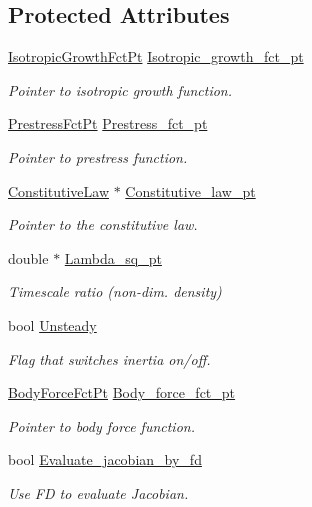 \subsection*{Protected Attributes}
\begin{DoxyCompactItemize}
\item 
\hyperlink{classoomph_1_1PVDEquationsBase_a59fc7069e0330c399ff53aebb6c67729}{Isotropic\+Growth\+Fct\+Pt} \hyperlink{classoomph_1_1PVDEquationsBase_a95f25d5e75bc4af1a6eeeb862546c4ea}{Isotropic\+\_\+growth\+\_\+fct\+\_\+pt}
\begin{DoxyCompactList}\small\item\em Pointer to isotropic growth function. \end{DoxyCompactList}\item 
\hyperlink{classoomph_1_1PVDEquationsBase_a457b9ffb2b62ecc0cf5fe61cf28e98e5}{Prestress\+Fct\+Pt} \hyperlink{classoomph_1_1PVDEquationsBase_ab3093822672a836a47f5a538dc25b2e8}{Prestress\+\_\+fct\+\_\+pt}
\begin{DoxyCompactList}\small\item\em Pointer to prestress function. \end{DoxyCompactList}\item 
\hyperlink{classoomph_1_1ConstitutiveLaw}{Constitutive\+Law} $\ast$ \hyperlink{classoomph_1_1PVDEquationsBase_a4cdbec1d2a282493984883e0e186d393}{Constitutive\+\_\+law\+\_\+pt}
\begin{DoxyCompactList}\small\item\em Pointer to the constitutive law. \end{DoxyCompactList}\item 
double $\ast$ \hyperlink{classoomph_1_1PVDEquationsBase_aeba8ca692b3ea3b8624f3dcc4ab874b7}{Lambda\+\_\+sq\+\_\+pt}
\begin{DoxyCompactList}\small\item\em Timescale ratio (non-\/dim. density) \end{DoxyCompactList}\item 
bool \hyperlink{classoomph_1_1PVDEquationsBase_a0d7944084e6386d9a23225420e7dcdff}{Unsteady}
\begin{DoxyCompactList}\small\item\em Flag that switches inertia on/off. \end{DoxyCompactList}\item 
\hyperlink{classoomph_1_1PVDEquationsBase_aa0d7dc7279aff03dfcc3ad35bb6653be}{Body\+Force\+Fct\+Pt} \hyperlink{classoomph_1_1PVDEquationsBase_a2e578673c31d1afa7fa6f1dc460299ed}{Body\+\_\+force\+\_\+fct\+\_\+pt}
\begin{DoxyCompactList}\small\item\em Pointer to body force function. \end{DoxyCompactList}\item 
bool \hyperlink{classoomph_1_1PVDEquationsBase_ab63c545f5b34501a58d5d47c56ba1471}{Evaluate\+\_\+jacobian\+\_\+by\+\_\+fd}
\begin{DoxyCompactList}\small\item\em Use FD to evaluate Jacobian. \end{DoxyCompactList}\end{DoxyCompactItemize}
